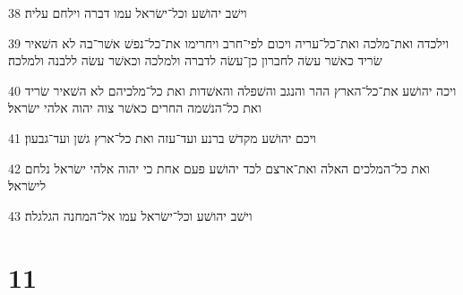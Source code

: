 \par 38 וישׁב יהושׁע וכל־ישׂראל עמו דברה וילחם עליה׃
\par 39 וילכדה ואת־מלכה ואת־כל־עריה ויכום לפי־חרב ויחרימו את־כל־נפשׁ אשׁר־בה לא השׁאיר שׂריד כאשׁר עשׂה לחברון כן־עשׂה לדברה ולמלכה וכאשׁר עשׂה ללבנה ולמלכה׃
\par 40 ויכה יהושׁע את־כל־הארץ ההר והנגב והשׁפלה והאשׁדות ואת כל־מלכיהם לא השׁאיר שׂריד ואת כל־הנשׁמה החרים כאשׁר צוה יהוה אלהי ישׂראל׃
\par 41 ויכם יהושׁע מקדשׁ ברנע ועד־עזה ואת כל־ארץ גשׁן ועד־גבעון׃
\par 42 ואת כל־המלכים האלה ואת־ארצם לכד יהושׁע פעם אחת כי יהוה אלהי ישׂראל נלחם לישׂראל׃
\par 43 וישׁב יהושׁע וכל־ישׂראל עמו אל־המחנה הגלגלה׃

\chapter{11}


